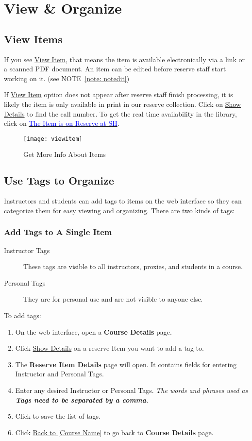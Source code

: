 \chapter{View \& Organize}
\label{ch:organize}
\section{View Items}
\label{sec:viewitem}
If you see \uline{View Item}, that means the item is available electronically via a link or a scanned PDF document. An item can be edited before reserve staff start working on it. (see NOTE~\ref{note: notedit}) 

If \uline{View Item} option does not appear after reserve staff finish processing, it is likely the item is only available in print in our reserve collection.  Click on \uline{Show Details} to find the call number. To get the real time availability in the library, click on \uline{\textcolor{blue}{The Item is on Reserve at SH}}.

\vspace*{4ex}
\begin{figure}[h]
    \centering
    \texttt{[image: viewitem]}
    \caption{Get More Info About Items}
    \label{fig:viewitem}
\end{figure}

\section{Use Tags to Organize}
\label{sec:tags}
Instructors and students can add tags to items on the \ares web interface so they can categorize them for easy viewing and organizing. There are two kinds of tags:
\subsection{Add Tags to A Single Item}
\begin{description}
    \item[Instructor Tags] These tags are visible to all instructors, proxies, and students in a course.
    \item[Personal Tags] They are for personal use and are not visible to anyone else.
\end{description}
To add tags:
\begin{enumerate}
    \item On the \ares web interface, open a \textbf{Course Details} page.
    \item Click \uline{Show Details} on a reserve Item you want to add a tag to.
    \item The \textbf{Reserve Item Details} page will open. It contains fields for entering Instructor and Personal Tags.
    \item Enter any desired Instructor or Personal Tags. \emph{The words and phrases used as \textbf{Tags need to be separated by a comma}}.
    \item Click  to save the list of tags.
    \item Click \uline{Back to [Course Name]} to go back to \textbf{Course Details} page.
\end{enumerate}

